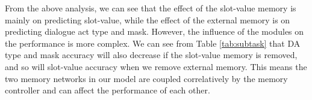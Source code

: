 



From the above analysis, we can see that the effect of the slot-value memory is mainly on predicting slot-value, while the effect of the external memory is on predicting dialogue act type and mask.
However, the influence of the modules on the performance is more complex. We can see from Table \ref{tab:subtask} that DA type and mask accuracy will also decrease if the slot-value memory is removed, and so will slot-value accuracy when we remove external memory. This means the two memory networks in our model are coupled correlatively by the memory controller and can affect the performance of each other.


% 


